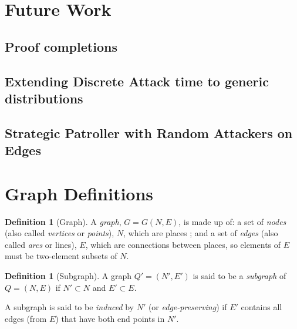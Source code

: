 \documentclass[a4paper,10pt]{article}
\theoremstyle{definition}
\newtheorem{definition}[theorem]{Definition}
\theoremstyle{definition}
\theoremstyle{remark}
\theoremstyle{definition}
\begin{document}
\section{Future Work}
\subsection{Proof completions}
\subsection{Extending Discrete Attack time to generic distributions}
\subsection{Strategic Patroller with Random Attackers on Edges}



\newpage
\appendix
{}
\appendixpage
\addappheadtotoc
\section{Graph Definitions}
\label{Appendix:Graph Definitions}
\begin{definition}[Graph]
A \textit{graph}, $G=G(N,E)$, is made up of: a set of \textit{nodes} (also called \textit{vertices} or \textit{points}), $N$, which are places ; and a set of \textit{edges} (also called \textit{arcs} or lines), $E$, which are connections between places, so elements of $E$ must be two-element subsets of $N$.
\end{definition}


\begin{definition}[Subgraph]
A graph $Q'=(N',E')$ is said to be a \textit{subgraph} of $Q=(N,E)$ if $N' \subset N$ and $E' \subset E$.

A subgraph is said to be \textit{induced} by $N'$ (or \textit{edge-preserving}) if $E'$ contains all edges (from $E$) that have both end points in $N'$.
\end{definition}
\end{document}
